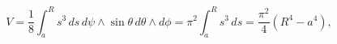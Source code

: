 \begin{equation}
V=\frac{1}{8} \int_{a}^{R} s^3\,ds\, d\psi \wedge \sin\theta\, d\theta
\wedge d\phi= \pi^2\int_{a}^{R} s^3\,ds=\frac{\pi^2}{4}\left(R^4-a^4\right),
\end{equation}


